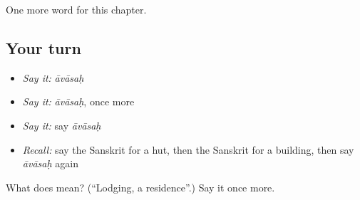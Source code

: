 \begin{grammarlens}[title={What you've built}]
One more word for this chapter.
\end{grammarlens}

\subsection*{Your turn}
\begin{itemize}
\raggedright
  \item \emph{Say it:} \emph{āvāsaḥ}
  \item \emph{Say it:} \emph{āvāsaḥ}, once more
  \item \emph{Say it:} say \emph{āvāsaḥ}
  \item \emph{Recall:} say the Sanskrit for a hut, then the Sanskrit for a building, then say \emph{āvāsaḥ} again
\end{itemize}

\begin{tcolorbox}[breakable,colback=teal!4,colframe=teal!35!black,title={Before you move on}]
What does  mean? (\textquotedblleft{}Lodging, a residence\textquotedblright{}.) Say it once more.
\end{tcolorbox}
